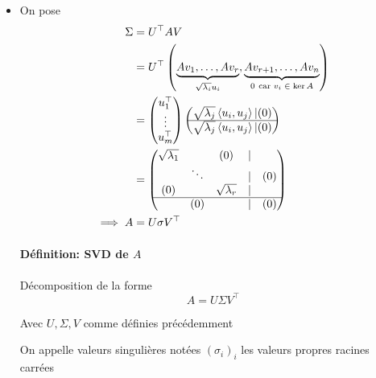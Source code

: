 \documentclass{article}
\newenvironment{definition}[1][\unskip]{
	\paragraph{Définition: #1}

}{}
\begin{document}
\begin{itemize}
		 \item  On pose \begin{align*}
		 	\Sigma &= U^\top AV \\
			       &= U^\top \left(\underbrace{Av_1, \ldots, Av_r}_{\sqrt{\lambda_i} u_i }, \underbrace{A v_{r+1}, \ldots, A v_n}_{0\ \text{car $v_i \in \ker A$}}\right) \\
			       &= \begin{pmatrix} u_1^\top \\ \vdots \\ u_m^\top \end{pmatrix} \begin{pmatrix} \sqrt{\lambda_j}  \left<u_i, u_j \right> | (0) \\ \hline \sqrt{\lambda_j} \left<u_i, u_j \right> | (0) \end{pmatrix}   \\
			       &= \begin{pmatrix} \sqrt{\lambda_1} &  & (0) &  | & \\  & \ddots &  & |  & (0) \\  (0) &  & \sqrt{\lambda_r}  & | & \\ \hline & (0) & & | & (0) \end{pmatrix}  \\
			       \implies A &= U \sigma V^\top \\
		 \end{align*}


		 \begin{definition}[SVD de $A$]
		 	Décomposition de la forme \[
		 		A = U \Sigma V^\top
		 	\] 

			Avec $U, \Sigma, V$ comme définies précédemment

			On appelle valeurs singulières notées  $(\sigma_i)_i$ les valeurs propres racines carrées
		 \end{definition}


\end{itemize}


%
\end{document}
